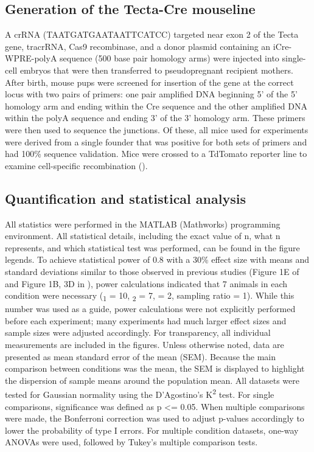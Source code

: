 \documentclass[9pt,lineno]{elife}
\begin{document}
\subsection{Generation of the Tecta-Cre mouseline}
A crRNA (TAATGATGAATAATTCATCC) targeted near exon 2 of the Tecta gene, tracrRNA, Cas9 recombinase, and a donor plasmid containing an iCre-WPRE-polyA sequence (500 base pair homology arms) were injected into single-cell embryos that were then transferred to pseudopregnant recipient mothers. After birth, mouse pups were screened for insertion of the gene at the correct locus with two pairs of primers: one pair amplified DNA beginning 5’ of the 5’ homology arm and ending within the Cre sequence and the other amplified DNA within the polyA sequence and ending 3’ of the 3’ homology arm. These primers were then used to sequence the junctions. Of these, all mice used for experiments were derived from a single founder that was positive for both sets of primers and had 100\% sequence validation. Mice were crossed to a TdTomato reporter line to examine cell-specific recombination ().

\subsection{Quantification and statistical analysis}
All statistics were performed in the MATLAB (Mathworks) programming environment. All statistical details, including the exact value of n, what n represents, and which statistical test was performed, can be found in the figure legends. To achieve statistical power of 0.8 with a 30\% effect size with means and standard deviations similar to those observed in previous studies (Figure 1E of \cite{Tritsch2007} and Figure 1B, 3D in \cite{Wang2015}), power calculations indicated that 7 animals in each condition were necessary (\textmu \textsubscript{1} = 10, \textmu \textsubscript{2} = 7, \textsigma \hspace{0.4mm} = 2, sampling ratio = 1). While this number was used as a guide, power calculations were not explicitly performed before each experiment; many experiments had much larger effect sizes and sample sizes were adjusted accordingly. For transparency, all individual measurements are included in the figures. Unless otherwise noted, data are presented as mean \textpm \hspace{0.3mm} standard error of the mean (SEM). Because the main comparison between conditions was the mean, the SEM is displayed to highlight the dispersion of sample means around the population mean. All datasets were tested for Gaussian normality using the D’Agostino’s K\textsuperscript{2} test. For single comparisons, significance was defined as p <= 0.05. When multiple comparisons were made, the Bonferroni correction was used to adjust p-values accordingly to lower the probability of type I errors. For multiple condition datasets, one-way ANOVAs were used, followed by Tukey’s multiple comparison tests.
\end{document}
